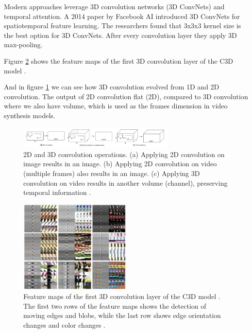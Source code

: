 Modern approaches leverage 3D convolution networks (3D ConvNets) and temporal attention. A 2014 paper \cite{tran2015learning} by Facebook AI introduced 3D ConvNets for spatiotemporal feature learning. The researchers found that 3x3x3 kernel size is the best option for 3D ConvNets. After every convolution layer they apply 3D max-pooling.

Figure \ref{fig:c3d_feature_maps} shows the feature maps of the first 3D convolution layer of the C3D model \cite{tran2015learning}.

And in figure \ref{fig:video_synthesis_3d_conv} we can see how 3D convolution evolved from 1D and 2D convolution. The output of 2D convolution flat (2D), compared to 3D convolution where we also have volume, which is used as the frames dimension in video synthesis models.

\begin{figure}
    \centering
    \includegraphics[width=0.7\textwidth]{images/video_synthesis/conv.png}
    \caption{2D and 3D convolution operations. (a) Applying 2D convolution on image results in an image. (b) Applying 2D convolution on video (multiple frames) also results in an image. (c) Applying 3D convolution on video results in another volume (channel), preserving temporal information \cite{tran2015learning}.}
    \label{fig:video_synthesis_3d_conv}
\end{figure}

\begin{figure}
    \centering
    \includegraphics[width=0.5\textwidth]{images/video_synthesis/c3d_feature_maps.png}
    \caption{Feature maps of the first 3D convolution layer of the C3D model \cite{tran2015learning}. The first two rows of the feature maps shows the detection of moving edges and blobs, while the last row shows edge orientation changes and color changes \cite{tran2015learning}.}
    \label{fig:c3d_feature_maps}
\end{figure}

